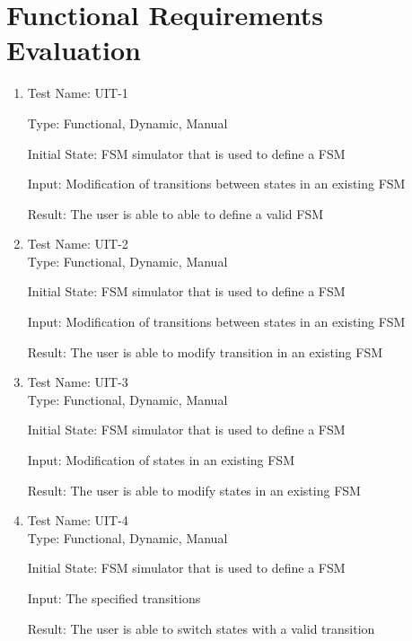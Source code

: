 \documentclass[12pt, titlepage]{article}
\begin{document}
\section{Functional Requirements Evaluation}
    \begin{enumerate}
        \item Test Name: UIT-1 
        
              Type: Functional, Dynamic, Manual
              
              Initial State: FSM simulator that is used to define a FSM
              
			  Input: Modification of transitions between states in an existing FSM
			  
              Result: The user is able to able to define a valid FSM
        
        \item Test Name: UIT-2\\
        
            Type: Functional, Dynamic, Manual
					
            Initial State: FSM simulator that is used to define a FSM
					
            Input: Modification of transitions between states in an existing FSM

              Result: The user is able to modify transition in an existing FSM
        
        \item Test Name: UIT-3\\
        
            Type: Functional, Dynamic, Manual
					
            Initial State: FSM simulator that is used to define a FSM
					
            Input: Modification of states in an existing FSM

             Result: The user is able to modify states in an existing FSM
        
        \item Test Name: UIT-4\\
        
            Type: Functional, Dynamic, Manual
					
            Initial State: FSM simulator that is used to define a FSM
					
            Input: The specified transitions

            Result: The user is able to switch states with a valid transition
              

\end{enumerate}
\end{document}
